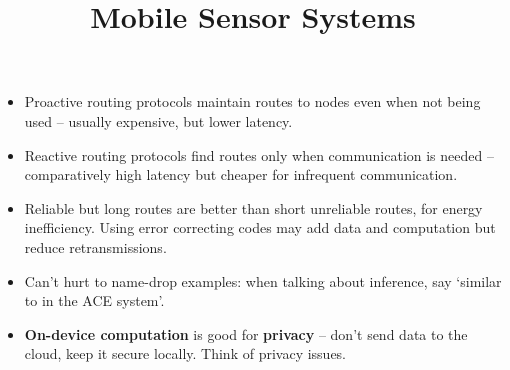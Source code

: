 \documentclass[a4paper, 11pt]{article}
\title{\vspace{-2cm}Mobile Sensor Systems\vspace{-1.5cm}}
\author{}
\date{}
\begin{document}
\maketitle

\begin{itemize}
\item Proactive routing protocols maintain routes to nodes even when not being used -- usually expensive, but lower latency.
\item Reactive routing protocols find routes only when communication is needed -- comparatively high latency but cheaper for infrequent communication.
\item Reliable but long routes are better than short unreliable routes, for energy inefficiency. Using error correcting codes may add data and computation but reduce retransmissions.
\item Can't hurt to name-drop examples: when talking about inference, say `similar to in the ACE system'.
\item \textbf{On-device computation} is good for \textbf{privacy} -- don't send data to the cloud, keep it secure locally. Think of privacy issues.
\end{itemize}
\end{document}
